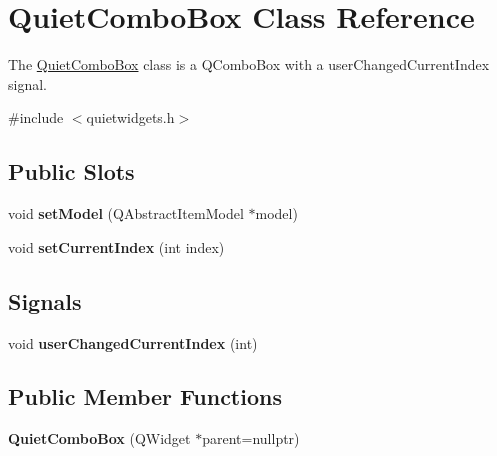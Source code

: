 \hypertarget{class_quiet_combo_box}{\section{\-Quiet\-Combo\-Box \-Class \-Reference}
\label{class_quiet_combo_box}
}


\-The \hyperlink{class_quiet_combo_box}{\-Quiet\-Combo\-Box} class is a \-Q\-Combo\-Box with a user\-Changed\-Current\-Index signal.  




{\ttfamily \#include $<$quietwidgets.\-h$>$}

\subsection*{\-Public \-Slots}
\begin{DoxyCompactItemize}
\item 
\hypertarget{class_quiet_combo_box_a760934024a1d11cba8a51d993fb47dba}{void {\bfseries set\-Model} (\-Q\-Abstract\-Item\-Model $\ast$model)}\label{class_quiet_combo_box_a760934024a1d11cba8a51d993fb47dba}

\item 
\hypertarget{class_quiet_combo_box_a4134cf3f62ef653ee24d8b52cea56455}{void {\bfseries set\-Current\-Index} (int index)}\label{class_quiet_combo_box_a4134cf3f62ef653ee24d8b52cea56455}

\end{DoxyCompactItemize}
\subsection*{\-Signals}
\begin{DoxyCompactItemize}
\item 
\hypertarget{class_quiet_combo_box_a6312d1e75b1dcb4c5c3b6ad1ac4be524}{void {\bfseries user\-Changed\-Current\-Index} (int)}\label{class_quiet_combo_box_a6312d1e75b1dcb4c5c3b6ad1ac4be524}

\end{DoxyCompactItemize}
\subsection*{\-Public \-Member \-Functions}
\begin{DoxyCompactItemize}
\item 
\hypertarget{class_quiet_combo_box_a030bd6a01f30ba67f4b8cf15b959d966}{{\bfseries \-Quiet\-Combo\-Box} (\-Q\-Widget $\ast$parent=nullptr)}\label{class_quiet_combo_box_a030bd6a01f30ba67f4b8cf15b959d966}

\end{DoxyCompactItemize}


